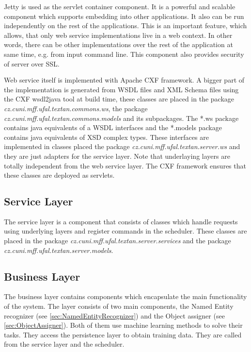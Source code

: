 Jetty is used as the servlet container component. It is a powerful and scalable
component which supports embedding into other applications. It also can be run independently
on the rest of the applications. This is an important feature, which allows, that only
web service implementations live in a web context. %
In other words, there can be
other implementations over the rest of the application at same time, e.g. from input
command line. This component also provides security of \textan{} server over SSL.

Web service itself is implemented with Apache CXF framework. A bigger part of
the implementation is generated from WSDL files and XML Schema files using the
CXF wsdl2java tool at build time, these classes are placed in the package %
\emph{cz.\-cuni.\-mff.\-ufal.\-textan.\-commons.\-ws}, the package
\emph{cz.\-cuni.\-mff.\-ufal.\-textan.\-commons.\-models} and its subpackages. %
The *.ws package contains java equivalents of a WSDL interfaces and the *.models
package contains java equivalents of XSD complex types. These interfaces are
implemented in classes placed the package \emph{cz.\-cuni.\-mff.\-ufal.\-textan.\-server.\-ws}
and they are just adapters for the service layer. Note that underlaying layers are
totally independent from the web service layer. The CXF framework ensures that
these classes are deployed as servlets.

\subsection{Service Layer}
The service layer is a component that consists of classes which handle requests
using underlying layers and register commands in the scheduler. These classes are
placed in the package \emph{cz.\-cuni.\-mff.\-ufal.\-textan.\-server.\-services}
and the package \emph{cz.\-cuni.\-mff.\-ufal.\-textan.\-server.\-models}.


\subsection{Business Layer}
The business layer contains components which encapsulate the main functionality
of the system. The layer consists of two main components, the Named Entity
recognizer (see \autoref{sec:NamedEntityRecognizer}) and the Object assigner 
(see \autoref{sec:ObjectAssigner}). Both of them use machine learning methods to solve
their tasks. They access the persistence layer to obtain training data. They
are called from the service layer and the scheduler.

